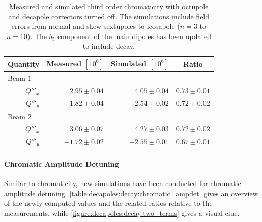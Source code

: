 \begin{table}[!htb]
    \centering
    \begin{tabular}{rrrr}
      \toprule
      Quantity     &  Measured $[10^6]$        &  Simulated $[10^{6}]$          &   \multicolumn{1}{c}{Ratio}     \\
      \midrule
        \multicolumn{1}{l}{Beam 1}    &                             &                                &             \\
                $Q'''_x$ &       $ 2.95 \pm 0.04$      & $ 4.05 \pm 0.04$               &  $0.73 \pm 0.01$  \\
                $Q'''_y$ &       $-1.82 \pm 0.04$      & $-2.54 \pm 0.02$               &  $0.72 \pm 0.02$  \\
        \multicolumn{1}{l}{Beam 2}    &                             &                                &             \\
                $Q'''_x$ &       $ 3.06 \pm 0.07$      & $ 4.27 \pm 0.03$               &  $0.72 \pm 0.02$  \\
                $Q'''_y$ &       $-1.72 \pm 0.02$      & $-2.55 \pm 0.01$               &  $0.67 \pm 0.01$ \\
      \bottomrule
    \end{tabular}
    \caption{Measured and simulated third order chromaticity with octupole and decapole correctors
    turned off. The simulations include field errors from normal and skew sextupoles to icosapole
    ($n=3$ to $n=10$). The $b_5$ component of the main dipoles has been updated to include decay.}
    \label{table:decapoles:decay:virgin_dq3_recompare}
\end{table}




\paragraph{Chromatic Amplitude Detuning}

Similar to chromaticity, new simulations have been conducted for chromatic amplitude detuning.
\cref{table:decapoles:decay:chromatic_ampdet} gives an overview of the newly computed values and 
the related ratios relative to the measurements, while \cref{figure:decapoles:decay:two_terms} gives
a visual clue.

